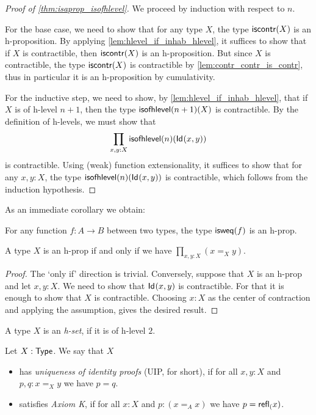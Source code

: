 \begin{proof}[Proof of \autoref{thm:isaprop_isofhlevel}]
  We proceed by induction with respect to $n$.
  
 For the base case, we need to show that for any type $X$, the type $\mathsf{iscontr}(X)$ is an
        h-proposition. By applying \autoref{lem:hlevel_if_inhab_hlevel}, it suffices to show that
        if $X$ is contractible, then $\mathsf{iscontr}(X)$ is an h-proposition.
        But since $X$ is contractible, the type $\mathsf{iscontr}(X)$ is contractible by \autoref{lem:contr_contr_is_contr},
          thus in particular it is an h-proposition by cumulativity.
 
 For the inductive step, we need to show, by \autoref{lem:hlevel_if_inhab_hlevel}, that if
        $X$ is of h-level $n+1$, then the type $\mathsf{isofhlevel}(n+1)(X)$ is contractible.
        By the definition of h-levels, we must show that
     \[  \prod_{x,y:X} \mathsf{isofhlevel}(n)(\mathsf{Id}_{}(x,y)) \]
    is contractible. Using (weak) function extensionality, it suffices to show that for any $x,y : X$,
     the type $\mathsf{isofhlevel}(n)(\mathsf{Id}_{}(x,y))$ is contractible, which follows from the induction hypothesis.
\end{proof}

As an immediate corollary we obtain:

\begin{cor}
 For any function $f \colon A \to B$ between two types, the type $\mathsf{isweq}(f)$ is an h-prop.
\end{cor}

\begin{thm}
 A type $X$ is an h-prop if and only if we have $\prod\limits_{x, y : X} (x =_X y)$.
\end{thm}

\begin{proof}
 The `only if' direction is trivial. Conversely, suppose that $X$ is an h-prop and let $x, y : X$. We need to show that $\mathsf{Id}_{}(x,y)$ is contractible. For that it is enough to show that $X$ is contractible. Choosing $x : X$ as the center of contraction and applying the assumption, gives the desired result.
\end{proof}

\begin{defn}
 A type $X$ is an {\em h-set}, if it is of h-level $2$.
\end{defn}

\begin{defn}
 Let $X : \mathsf{Type}$. We say that $X$
 \begin{itemize}
  \item has {\em uniqueness of identity proofs} (UIP, for short), if for all $x, y : X$ and $p, q : x =_X y$ we have $p = q$.
  \item satisfies {\em Axiom K}, if for all $x : X$ and $p : (x =_A x)$ we have $p = \mathsf{refl}_{(} x)$.
 \end{itemize}
\end{defn}

